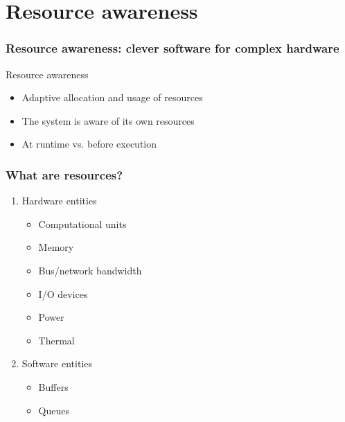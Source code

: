\documentclass[compress]{beamer}
\begin{document}
\section{Resource awareness}
\begin{frame}
	\frametitle{Resource awareness: clever software for complex hardware}
	\pause
	Resource awareness
	\vspace{5mm}
	\begin{itemize}
		\item Adaptive allocation and usage of resources
		\item The system is aware of its own resources
		\item At runtime vs. before execution
	\end{itemize}
\end{frame}

\begin{frame}
	\frametitle{What are resources?}
	\begin{enumerate}
		\item Hardware entities
			\begin{itemize}
				\item Computational units
				\item Memory
				\item Bus/network bandwidth
				\item I/O devices
				\item Power
				\item Thermal
			\end{itemize}
		\pause
		\item Software entities
			\begin{itemize}
				\item Buffers
				\item Queues
			\end{itemize}
	\end{enumerate}
\end{frame}
\end{document}
